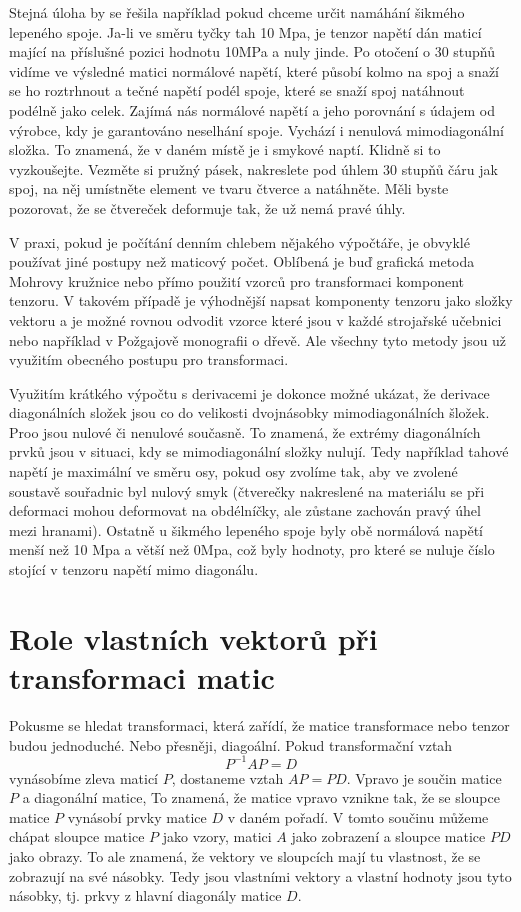 \documentclass[12pt]{article}
\begin{document}
Stejná úloha by se řešila například pokud chceme určit namáhání šikmého lepeného spoje. Ja-li ve směru tyčky tah 10 Mpa, je tenzor napětí dán maticí mající na příslušné pozici hodnotu 10MPa a nuly jinde. Po otočení o 30 stupňů vidíme ve výsledné matici normálové napětí, které působí kolmo na spoj a snaží se ho roztrhnout a tečné napětí podél spoje, které se snaží spoj natáhnout podélně jako celek. Zajímá nás normálové napětí a jeho porovnání s údajem od výrobce, kdy je garantováno neselhání spoje. Vychází i nenulová mimodiagonální složka. To znamená, že v daném místě je i smykové naptí. Klidně si to vyzkoušejte. Vezměte si pružný pásek, nakreslete pod úhlem 30 stupňů čáru jak spoj, na něj umístněte element ve tvaru čtverce a natáhněte. Měli byste pozorovat, že se čtvereček deformuje tak, že už nemá pravé úhly. 

V praxi, pokud je počítání denním chlebem nějakého výpočtáře, je obvyklé používat jiné postupy než maticový počet. Oblíbená je buď grafická metoda Mohrovy kružnice nebo přímo použití vzorců pro transformaci komponent tenzoru. V takovém případě je výhodnější napsat komponenty tenzoru jako složky vektoru a je možné rovnou odvodit vzorce které jsou v každé strojařské učebnici nebo například v Požgajově monografii o dřevě. Ale všechny tyto metody jsou už využitím obecného postupu pro transformaci. 

Využitím krátkého výpočtu s derivacemi je dokonce možné ukázat, že derivace diagonálních složek jsou co do velikosti dvojnásobky mimodiagonálních šložek. Proo jsou nulové či nenulové současně. To znamená, že extrémy diagonálních prvků jsou v situaci, kdy se mimodiagonální složky nulují. Tedy například tahové napětí je maximální ve směru osy, pokud osy zvolíme tak, aby ve zvolené soustavě souřadnic byl nulový smyk (čtverečky nakreslené na materiálu se při deformaci mohou deformovat na obdélníčky, ale zůstane zachován pravý úhel mezi hranami). Ostatně u šikmého lepeného spoje byly obě normálová napětí menší než 10 Mpa a větší než 0Mpa, což byly hodnoty, pro které se nuluje číslo stojící v tenzoru napětí mimo diagonálu.


\section{Role vlastních vektorů při transformaci matic}

Pokusme se hledat transformaci, která zařídí, že matice transformace nebo tenzor budou jednoduché. Nebo přesněji, diagoální. Pokud transformační vztah $$P^{-1}AP=D$$ vynásobíme zleva maticí $P$, dostaneme vztah $AP=PD$. Vpravo je součin matice $P$ a diagonální matice, To znamená, že matice vpravo vznikne tak, že se sloupce matice $P$ vynásobí prvky matice $D$ v daném pořadí. V tomto součinu můžeme chápat sloupce matice $P$ jako vzory, matici $A$ jako zobrazení a sloupce matice $PD$ jako obrazy. To ale znamená, že vektory ve sloupcích mají tu vlastnost, že se zobrazují na své násobky. Tedy jsou vlastními vektory a vlastní hodnoty jsou tyto násobky, tj. prkvy z hlavní diagonály matice $D$.
\end{document}
